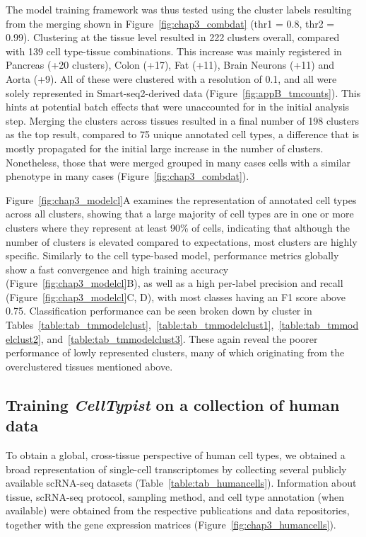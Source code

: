 The model training framework was thus tested using the cluster labels resulting from the merging shown in Figure~\ref{fig:chap3_combdat} (thr1 = 0.8, thr2 = 0.99). Clustering at the tissue level resulted in 222 clusters overall, compared with 139 cell type-tissue combinations. This increase was mainly registered in Pancreas (+20 clusters), Colon (+17), Fat (+11), Brain Neurons (+11) and Aorta (+9). All of these were clustered with a resolution of 0.1, and all were solely represented in Smart-seq2-derived data (Figure~\ref{fig:appB_tmcounts}). This hints at potential batch effects that were unaccounted for in the initial analysis step. Merging the clusters across tissues resulted in a final number of 198 clusters as the top result, compared to 75 unique annotated cell types, a difference that is mostly propagated for the initial large increase in the number of clusters. Nonetheless, those that were merged grouped in many cases cells with a similar phenotype in many cases (Figure~\ref{fig:chap3_combdat}).

Figure~\ref{fig:chap3_modelcl}A examines the representation of annotated cell types across all clusters, showing that a large majority of cell types are in one or more clusters where they represent at least 90\% of cells, indicating that although the number of clusters is elevated compared to expectations, most clusters are highly specific. Similarly to the cell type-based model, performance metrics globally show a fast convergence and high training accuracy (Figure~\ref{fig:chap3_modelcl}B), as well as a high per-label precision and recall (Figure~\ref{fig:chap3_modelcl}C, D), with most classes having an F1 score above 0.75. Classification performance can be seen broken down by cluster in Tables~\ref{table:tab_tmmodelclust},~\ref{table:tab_tmmodelclust1},~\ref{table:tab_tmmodelclust2}, and~\ref{table:tab_tmmodelclust3}. These again reveal the poorer performance of lowly represented clusters, many of which originating from the overclustered tissues mentioned above.


\subsection{Training \textit{CellTypist} on a collection of human data}
\label{section3.3_human}
To obtain a global, cross-tissue perspective of human cell types, we obtained a broad representation of single-cell transcriptomes by collecting several publicly available scRNA-seq datasets (Table~\ref{table:tab_humancells}). Information about tissue, scRNA-seq protocol, sampling method, and cell type annotation (when available) were obtained from the respective publications and data repositories, together with the gene expression matrices (Figure~\ref{fig:chap3_humancells}).

